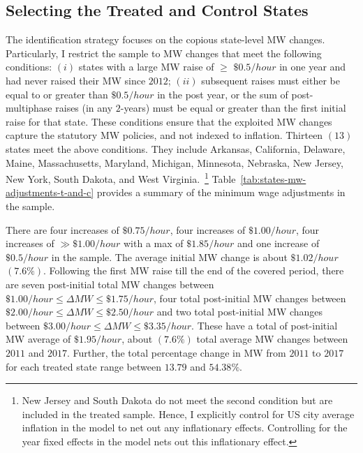 \documentclass{C:/Users/david/OneDrive/Documents/ULMS/PhD/Thesis/chapter3/src/climate_change/latex/Economic_Journal/OUP-EJ}
\begin{document}
    \subsection{Selecting the Treated and Control States}\label{subsec:selecting-the-treated-and-control-states}
    The identification strategy focuses on the copious state-level MW changes. Particularly, I restrict the sample to MW changes that meet the following conditions: $(i)$ states with a large MW raise of $\geq$ $\$0.5/hour$ in one year and had never raised their MW since $2012$; $(ii)$ subsequent raises must either be equal to or greater than $\$0.5/hour$ in the post year, or the sum of post-multiphase raises (in any $2$-years) must be equal or greater than the first initial raise for that state. These conditions ensure that the exploited MW changes capture the statutory MW policies, and not indexed to inflation. Thirteen $(13)$ states meet the above conditions. They include Arkansas, California, Delaware, Maine, Massachusetts, Maryland, Michigan, Minnesota, Nebraska, New Jersey, New York, South Dakota, and West Virginia.~\footnote{\tiny New Jersey and South Dakota do not meet the second condition but are included in the treated sample. Hence, I explicitly control for US city average inflation in the model to net out any inflationary effects. Controlling for the year fixed effects in the model nets out this inflationary effect.} Table~\ref{tab:states-mw-adjustments-t-and-c} provides a summary of the minimum wage adjustments in the sample.

    There are four increases of $\$0.75/hour$, four increases of $\$1.00/hour$, four increases of $\gg\$1.00/hour$ with a max of $\$1.85/hour$ and one increase of $\$0.5/hour$ in the sample. The average initial MW change is about $\$1.02/hour$ $(7.6\%)$. Following the first MW raise till the end of the covered period, there are seven post-initial total MW changes between $\$1.00/hour \leq \Delta MW \leq \$1.75/hour$, four total post-initial MW changes between $\$2.00/hour \leq \Delta MW \leq \$2.50/hour$ and two total post-initial MW changes between $\$3.00/hour \leq \Delta MW \leq \$3.35/hour$. These have a total of post-initial MW average of $\$1.95/hour$, about $(7.6\%)$ total average MW changes between $2011$ and $2017$. Further, the total percentage change in MW from $2011$ to $2017$ for each treated state range between $13.79$ and $54.38\%$.
    
\end{document}
